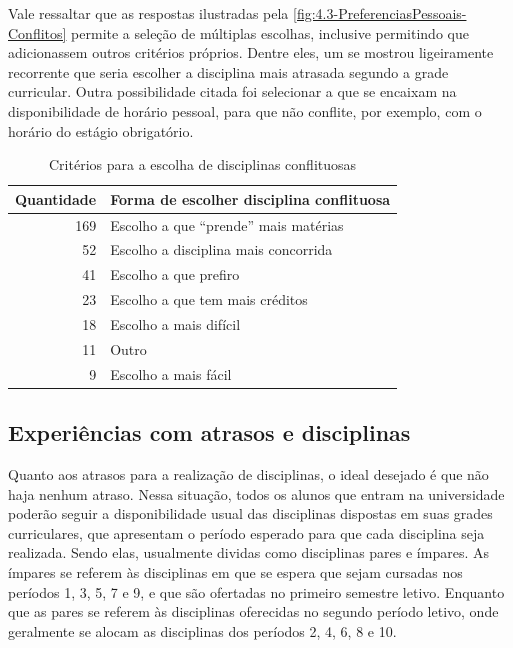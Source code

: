 Vale ressaltar que as respostas ilustradas pela \autoref{fig:4.3-PreferenciasPessoais-Conflitos} permite a seleção de múltiplas escolhas, inclusive permitindo que adicionassem outros critérios próprios. Dentre eles, um se mostrou ligeiramente recorrente que seria escolher a disciplina mais atrasada segundo a grade curricular. Outra possibilidade citada foi selecionar a que se encaixam na disponibilidade de horário pessoal, para que não conflite, por exemplo, com o horário do estágio obrigatório.

\begin{table}[htbp]\centering
  \caption{Critérios para a escolha de disciplinas conflituosas}
  \label{table:4.3-PreferenciasPessoais-Conflitos}
  \begin{tabular}{| r l |}
    \hline
    \textbf{Quantidade} & \textbf{Forma de escolher disciplina conflituosa} \\
    \hline
    169                 & Escolho a que ``prende'' mais matérias            \\
    52                  & Escolho a disciplina mais concorrida              \\
    41                  & Escolho a que prefiro                             \\
    23                  & Escolho a que tem mais créditos                   \\
    18                  & Escolho a mais difícil                            \\
    11                  & Outro                                             \\
    9                   & Escolho a mais fácil                              \\
    \hline
  \end{tabular}
\end{table}

\subsection{Experiências com atrasos e disciplinas} %

Quanto aos atrasos para a realização de disciplinas, o ideal desejado é que não haja nenhum atraso. Nessa situação, todos os alunos que entram na universidade poderão seguir a disponibilidade usual das disciplinas dispostas em suas grades curriculares, que apresentam o período esperado para que cada disciplina seja realizada. Sendo elas, usualmente dividas como disciplinas pares e ímpares. As ímpares se referem às disciplinas em que se espera que sejam cursadas nos períodos 1, 3, 5, 7 e 9, e que são ofertadas no primeiro semestre letivo. Enquanto que as pares se referem às disciplinas oferecidas no segundo período letivo, onde geralmente se alocam as disciplinas dos períodos 2, 4, 6, 8 e 10.

